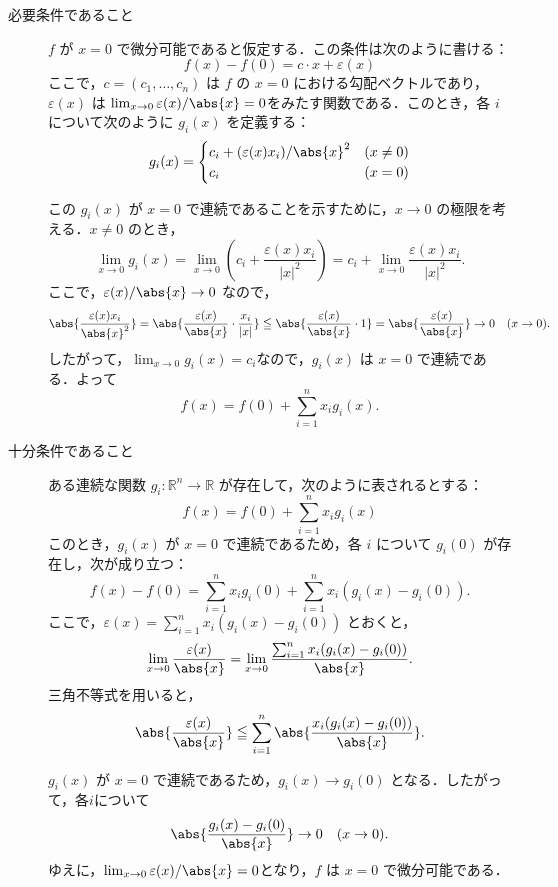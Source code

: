 \begin{tproof}
  \begin{description}
    \item[必要条件であること]
          $ f $ が $ x=0 $ で微分可能であると仮定する．この条件は次のように書ける：
          \[
            f(x) - f(0) = c \cdot x + \varepsilon(x)
          \]
          ここで，$ c = (c_1, \ldots, c_n) $ は $ f $ の $ x=0 $ における勾配ベクトルであり，$ \varepsilon(x) $ は
          $\lim_{x \to 0} \varepsilon(x)/\abs{x} = 0$をみたす関数である．このとき，各 $ i $ について次のように $ g_i(x) $ を定義する：
          \[
            g_i(x) =
            \begin{cases}
              c_i + (\varepsilon(x) x_i)/\abs{x}^2 & (x \ne 0) \\
              c_i                                  & (x = 0)
            \end{cases}
          \]

          この $ g_i(x) $ が $ x=0 $ で連続であることを示すために，$ x \to 0 $ の極限を考える．$ x \ne 0 $ のとき，
          \[
            \lim_{x \to 0} g_i(x) = \lim_{x \to 0} \left( c_i + \frac{\varepsilon(x) x_i}{|x|^2} \right) = c_i + \lim_{x \to 0} \frac{\varepsilon(x) x_i}{|x|^2}.
          \]
          ここで，$\varepsilon(x)/\abs{x} \to 0 $ なので，
          \[
            \abs{\frac{\varepsilon(x) x_i}{\abs{x}^2}} = \abs{\frac{\varepsilon(x)}{\abs{x}} \cdot \frac{x_i}{|x|}} \leqq  \abs{\frac{\varepsilon(x)}{\abs{x}} \cdot 1} = \abs{\frac{\varepsilon(x)}{\abs{x}}} \to 0 \quad (x \to 0).
          \]
          したがって，$\lim_{x \to 0} g_i(x) = c_i$なので，$ g_i(x) $ は $ x=0 $ で連続である．よって
          \[
            f(x) = f(0) + \sum_{i=1}^n x_i g_i(x).
          \]
    \item [十分条件であること]
          ある連続な関数 $ g_i \colon \mathbb{R}^n \to \mathbb{R} $ が存在して，次のように表されるとする：
          \[
            f(x) = f(0) + \sum_{i=1}^n x_i g_i(x)
          \]
          このとき，$ g_i(x) $ が $ x=0 $ で連続であるため，各 $ i $ について $ g_i(0) $ が存在し，次が成り立つ：
          \[
            f(x) - f(0) = \sum_{i=1}^n x_i g_i(0) + \sum_{i=1}^n x_i (g_i(x) - g_i(0)).
          \]
          ここで，$ \varepsilon(x) = \sum_{i=1}^n x_i (g_i(x) - g_i(0)) $ とおくと，
          \[
            \lim_{x \to 0} \frac{\varepsilon(x)}{\abs{x}} = \lim_{x \to 0} \frac{\sum_{i=1}^n x_i (g_i(x) - g_i(0))}{\abs{x}}.
          \]
          三角不等式を用いると，
          \[
            \abs{ \frac{\varepsilon(x)}{\abs{x}} } \leqq \sum_{i=1}^n \abs{ \frac{x_i(g_i(x) - g_i(0))}{\abs{x}} }.
          \]

          $ g_i(x) $ が $ x=0 $ で連続であるため，$ g_i(x) \to g_i(0) $ となる．したがって，各$ i $について
          \[
            \abs{ \frac{g_i(x) - g_i(0)}{\abs{x}} } \to 0 \quad (x \to 0).
          \]
          ゆえに，$\lim_{x \to 0} \varepsilon(x)/\abs{x} = 0$となり，$ f $ は $ x=0 $ で微分可能である．
  \end{description}
\end{tproof}

